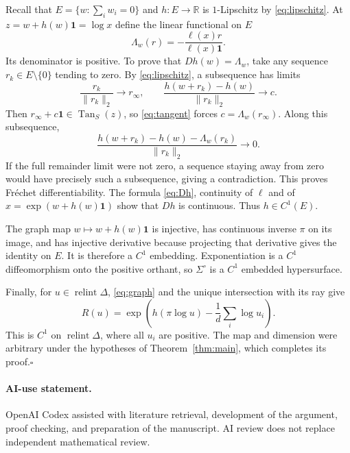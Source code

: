 \documentclass[11pt]{article}
\newcommand{\one}{\mathbf 1}
\newcommand{\relint}{\operatorname{relint}}
\newcommand{\Tan}{\operatorname{Tan}}
\begin{document}
Recall that $E=\{w:\sum_i w_i=0\}$ and $h:E\to\mathbb R$ is
$1$-Lipschitz by \eqref{eq:lipschitz}.
At $z=w+h(w)\one=\log x$ define the linear functional on $E$
\begin{equation}\label{eq:Dh}
 \Lambda_w(r)=-\frac{\ell(x)r}{\ell(x)\one}.
\end{equation}
Its denominator is positive. To prove that $Dh(w)=\Lambda_w$, take
any sequence $r_k\in E\setminus\{0\}$ tending to zero. By
\eqref{eq:lipschitz}, a subsequence has limits
\[
 \frac{r_k}{\|r_k\|_2}\longrightarrow r_\infty,\qquad
 \frac{h(w+r_k)-h(w)}{\|r_k\|_2}\longrightarrow c.
\]
Then $r_\infty+c\one\in\Tan_S(z)$, so \eqref{eq:tangent} forces
$c=\Lambda_w(r_\infty)$. Along this subsequence,
\[
 \frac{h(w+r_k)-h(w)-\Lambda_w(r_k)}{\|r_k\|_2}\longrightarrow0.
\]
If the full remainder limit were not zero, a sequence staying away from
zero would have precisely such a subsequence, giving a contradiction.
This proves Fr\'echet differentiability. The formula \eqref{eq:Dh},
continuity of $\ell$ and of $x=\exp(w+h(w)\one)$ show that $Dh$ is
continuous. Thus $h\in C^1(E)$.

The graph map $w\mapsto w+h(w)\one$ is injective, has continuous inverse
$\pi$ on its image, and has injective derivative because projecting that
derivative gives the identity on $E$. It is therefore a $C^1$ embedding.
Exponentiation is a $C^1$ diffeomorphism onto the positive orthant, so
$\Sigma^\circ$ is a $C^1$ embedded hypersurface.

Finally, for $u\in\relint\Delta$, \eqref{eq:graph} and the unique
intersection with its ray give
\begin{equation}\label{eq:R}
 R(u)=\exp\left(h(\pi\log u)-\frac1d\sum_i\log u_i\right).
\end{equation}
This is $C^1$ on $\relint\Delta$, where all $u_i$ are positive. The map
and dimension were arbitrary under the hypotheses of
Theorem~\ref{thm:main}, which completes its proof.\hfill$\square$

\paragraph{AI-use statement.}
OpenAI Codex assisted with literature retrieval, development of the argument,
proof checking, and preparation of the manuscript. AI review does not replace
independent mathematical review.
\end{document}
